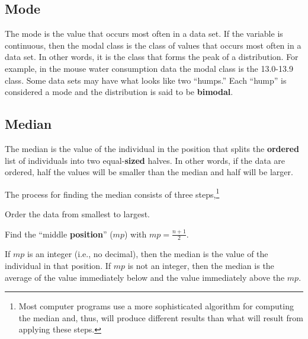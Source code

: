 \documentclass[10pt,openany]{book}\usepackage[]{graphicx}\usepackage[]{color}
\begin{document}

\vspace{-12pt}

\subsection{Mode}
The mode is the value that occurs most often in a data set.  If the variable is continuous, then the modal class is the class of values that occurs most often in a data set.  In other words, it is the class that forms the peak of a distribution.  For example, in the mouse water consumption data  the modal class is the 13.0-13.9 class.  Some data sets may have what looks like two ``humps.''  Each ``hump'' is considered a mode and the distribution is said to be \textbf{bimodal}.


\vspace{-12pt}

\subsection{Median} \label{sec:Median}
The median is the value of the individual in the position that splits the \textbf{ordered} list of individuals into two equal-\textbf{sized} halves.  In other words, if the data are ordered, half the values will be smaller than the median and half will be larger.

The process for finding the median consists of three steps,\footnote{Most computer programs use a more sophisticated algorithm for computing the median and, thus, will produce different results than what will result from applying these steps.}
\begin{Enumerate}
  \item Order the data from smallest to largest.
  \item Find the ``middle \textbf{position}'' ($mp$) with $mp=\frac{n+1}{2}$.
  \item If $mp$ is an integer (i.e., no decimal), then the median is the value of the individual in that position.  If $mp$ is not an integer, then the median is the average of the value immediately below and the value immediately above the $mp$.
\end{Enumerate}
\end{document}
